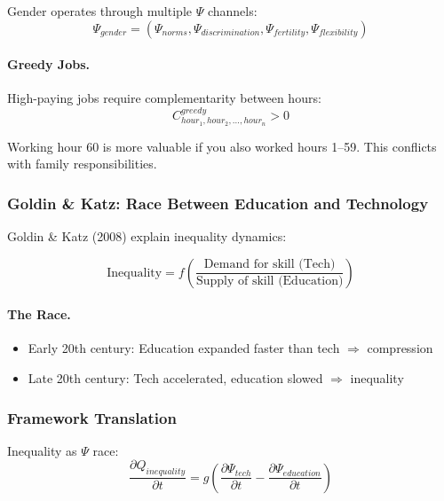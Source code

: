 Gender operates through multiple $\Psi$ channels:
\begin{equation}
\Psi_{gender} = (\Psi_{norms}, \Psi_{discrimination}, \Psi_{fertility}, \Psi_{flexibility})
\end{equation}

\paragraph{Greedy Jobs.}
High-paying jobs require complementarity between hours:
\begin{equation}
C_{hour_1, hour_2, \ldots, hour_n}^{greedy} > 0
\end{equation}

Working hour 60 is more valuable if you also worked hours 1--59.
This conflicts with family responsibilities.

\subsubsection{Goldin \& Katz: Race Between Education and Technology}

Goldin \& Katz (2008) explain inequality dynamics:

\begin{equation}
\boxed{
\text{Inequality} = f\left(\frac{\text{Demand for skill (Tech)}}{\text{Supply of skill (Education)}}\right)
}
\label{eq:goldin-katz}
\end{equation}

\paragraph{The Race.}
\begin{itemize}
    \item Early 20th century: Education expanded faster than tech $\Rightarrow$ compression
    \item Late 20th century: Tech accelerated, education slowed $\Rightarrow$ inequality
\end{itemize}

\subsubsection{Framework Translation}

Inequality as $\Psi$ race:
\begin{equation}
\frac{\partial Q_{inequality}}{\partial t} = g\left(\frac{\partial \Psi_{tech}}{\partial t} - \frac{\partial \Psi_{education}}{\partial t}\right)
\end{equation}

